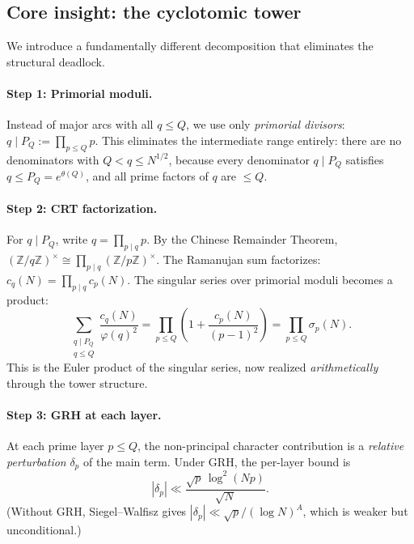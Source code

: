 \documentclass[11pt,a4paper]{article}
\theoremstyle{remark}
\newcommand{\Z}{\mathbb{Z}}
\begin{document}
\subsection{Core insight: the cyclotomic tower}

We introduce a fundamentally different decomposition that eliminates
the structural deadlock.

\paragraph{Step 1: Primorial moduli.}
Instead of major arcs with all $q \leq Q$, we use only
\emph{primorial divisors}: $q \mid P_Q := \prod_{p \leq Q} p$.
This eliminates the intermediate range entirely: there are no
denominators with $Q < q \leq N^{1/2}$, because every denominator
$q \mid P_Q$ satisfies $q \leq P_Q = e^{\theta(Q)}$, and all prime
factors of $q$ are $\leq Q$.

\paragraph{Step 2: CRT factorization.}
For $q \mid P_Q$, write $q = \prod_{p \mid q} p$.
By the Chinese Remainder Theorem,
$(\Z/q\Z)^\times \cong \prod_{p \mid q}(\Z/p\Z)^\times$.
The Ramanujan sum factorizes: $c_q(N) = \prod_{p \mid q}c_p(N)$.
The singular series over primorial moduli becomes a product:
\begin{equation}
\label{eq:tower-factorization}
  \sum_{\substack{q \mid P_Q \\ q \leq Q}}\frac{c_q(N)}{\varphi(q)^2}
  = \prod_{p \leq Q}\left(1 + \frac{c_p(N)}{(p-1)^2}\right)
  = \prod_{p \leq Q}\sigma_p(N).
\end{equation}
This is the Euler product of the singular series, now realized
\emph{arithmetically} through the tower structure.

\paragraph{Step 3: GRH at each layer.}
At each prime layer $p \leq Q$, the non-principal character contribution
is a \emph{relative perturbation} $\delta_p$ of the main term.
Under GRH, the per-layer bound is
\begin{equation}
\label{eq:per-layer-GRH}
  |\delta_p| \ll \frac{\sqrt{p}\,\log^2(Np)}{\sqrt{N}}.
\end{equation}
(Without GRH, Siegel--Walfisz gives
$|\delta_p| \ll \sqrt{p}/(\log N)^A$, which is weaker but unconditional.)
\end{document}
